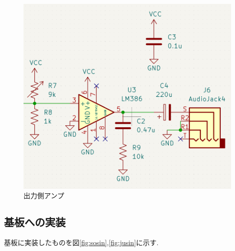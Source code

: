 \documentclass[a4paper,10pt]{article}
\begin{document}
\begin{multicols}{2}[\raggedcolumns]
\begin{figure}[H]
    \centering
    \includegraphics[width=\linewidth]{figure/out_amp.png} 
    \caption{出力側アンプ} 
    \label{fig:out_amp}
\end{figure}
\newpage
\subsection{基板への実装}
基板に実装したものを図\ref{fig:sosin},\ref{fig:jusin}に示す.



\end{multicols}
\end{document}
